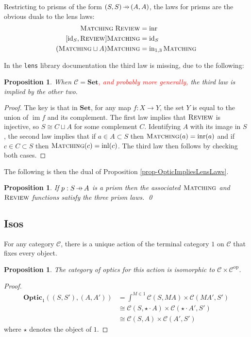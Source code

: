 \documentclass[11pt,a4paper]{article}
\theoremstyle{plain}
\newtheorem{proposition}[theorem]{Proposition}
\theoremstyle{definition}
\newcommand{\C}{\mathscr{C}}
\newcommand{\Set}{\mathbf{Set}}
\newcommand{\Optic}{\mathbf{Optic}}
\newcommand{\id}{\mathrm{id}}
\newcommand{\op}{\mathrm{op}}
\newcommand{\inl}{\mathrm{inl}}
\newcommand{\inr}{\mathrm{inr}}
\DeclareMathOperator{\im}{im}
\newcommand{\freview}{\textsc{Review}}
\newcommand{\fmatching}{\textsc{Matching}}
\newcommand{\hto}{\ensuremath{\,\mathaccent\shortmid\rightarrow\,}}
\newcommand{\todo}[1]{\textcolor{red}{\small #1}}
\begin{document}
Restricting to prisms of the form $(S, S) \hto (A, A)$, the laws for prisms are the obvious duals to the lens laws: 
\begin{align*}
\fmatching \; \freview &= \inr \\
[\id_S, \freview] \fmatching &= \id_S \\
(\fmatching \sqcup A) \fmatching &= \mathrm{in}_{1,3} \, \fmatching
\end{align*}

In the \texttt{lens} library documentation the third law is missing, due to the following:

\begin{proposition}
When $\C = \Set$\todo{, and probably more generally,} the third law is implied by the other two.
\end{proposition}
\begin{proof}
The key is that in $\Set$, for any map $f : X \to Y$, the set $Y$ is equal to the union of $\im f$ and its complement. The first law implies that $\freview$ is injective, so $S \cong C \sqcup A$ for some complement $C$. Identifying $A$ with its image in $S$, the second law implies that if $a\in A \subset S$ then $\fmatching(a) = \inr(a)$ and if $c\in C \subset S$ then $\fmatching(c) = \inl(c)$. The third law then follows by checking both cases.
\end{proof}

The following is then the dual of Proposition \ref{prop-OpticImpliesLensLaws}.
\begin{proposition}
\label{prop-OpticImpliesPrismLaws}
If $p : S \hto A$ is a prism then the associated $\fmatching$ and $\freview$ functions satisfy the three prism laws. \qed
\end{proposition}

\subsection{Isos}

For any category $\C$, there is a unique action of the terminal category $1$ on $\C$ that fixes every object. 

\begin{proposition}
The category of optics for this action is isomorphic to $\C \times \C^\op$.
\end{proposition}
\begin{proof}
\begin{align*}
\Optic_1((S, S'), (A, A')) &= \int^{M \in 1} \C(S, MA) \times \C(MA', S') \\
&\cong \C(S, \star \cdot A) \times \C(\star \cdot A', S') \\
&\cong \C(S, A) \times \C(A', S')
\end{align*}
where $\star$ denotes the object of $1$.
\end{proof}
\end{document}

